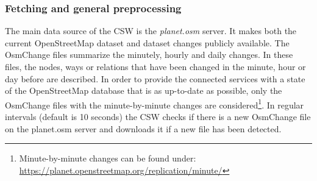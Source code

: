 \documentclass[conference]{IEEEtran}
\begin{document}
\subsubsection{Fetching and general preprocessing}
\label{sec:preprocessing}
The main data source of the CSW is the \textit{planet.osm} server. It makes both the current OpenStreetMap dataset and dataset changes publicly available. The OsmChange files summarize the minutely, hourly and daily changes. In these files, the nodes, ways or relations that have been changed in the minute, hour or day before are described. In order to provide the connected services with a state of the OpenStreetMap database that is as up-to-date as possible, only the OsmChange files with the minute-by-minute changes are considered\footnote{Minute-by-minute changes can be found under: \url{https://planet.openstreetmap.org/replication/minute/}}. In regular intervals (default is 10 seconds) the CSW checks if there is a new OsmChange file on the planet.osm server and downloads it if a new file has been detected.
\end{document}
